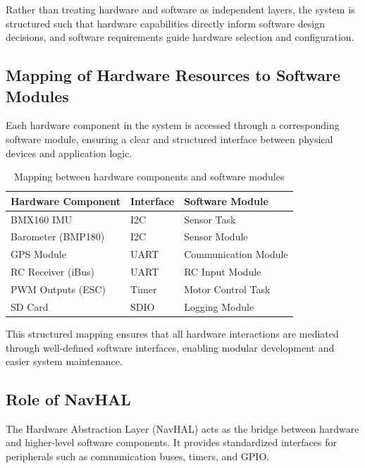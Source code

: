 Rather than treating hardware and software as independent layers, the system is structured such that hardware capabilities directly inform software design decisions, and software requirements guide hardware selection and configuration.

\subsection{Mapping of Hardware Resources to Software Modules}

Each hardware component in the system is accessed through a corresponding software module, ensuring a clear and structured interface between physical devices and application logic.

\begin{table}[H]
    \centering
    \begin{tabular}{|l|l|l|}
        \hline
        \textbf{Hardware Component} & \textbf{Interface} & \textbf{Software Module} \\
        \hline
        BMX160 IMU & I2C & Sensor Task \\
        \hline
        Barometer (BMP180) & I2C & Sensor Module \\
        \hline
        GPS Module & UART & Communication Module \\
        \hline
        RC Receiver (iBus) & UART & RC Input Module \\
        \hline
        PWM Outputs (ESC) & Timer & Motor Control Task \\
        \hline
        SD Card & SDIO & Logging Module \\
        \hline
    \end{tabular}
    \caption{Mapping between hardware components and software modules}
    \label{tab:hw_sw_mapping}
\end{table}

This structured mapping ensures that all hardware interactions are mediated through well-defined software interfaces, enabling modular development and easier system maintenance.

\subsection{Role of NavHAL}

The Hardware Abstraction Layer (NavHAL) acts as the bridge between hardware and higher-level software components. It provides standardized interfaces for peripherals such as communication buses, timers, and GPIO.

